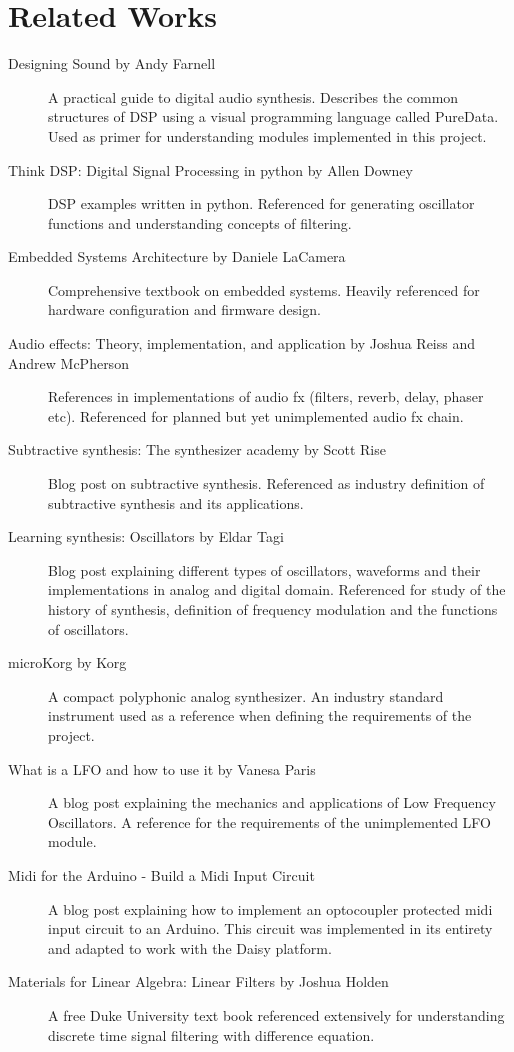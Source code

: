 \documentclass[acmlarge,screen]{acmart}
\begin{document}
\section{Related Works}
\begin{description}
	\item[Designing Sound by Andy Farnell] A practical guide to digital audio synthesis. Describes the common structures of DSP using a visual programming language called PureData. Used as primer for understanding modules implemented in this project.
	\item[Think DSP: Digital Signal Processing in python by Allen Downey] DSP examples written in python. Referenced for generating oscillator functions and understanding concepts of filtering.
	\item[Embedded Systems Architecture by Daniele LaCamera] Comprehensive textbook on embedded systems. Heavily referenced for hardware configuration and firmware design.
	\item[Audio effects: Theory, implementation, and application by Joshua Reiss and Andrew McPherson] References in implementations of audio fx (filters, reverb, delay, phaser etc). Referenced for planned but yet unimplemented audio fx chain.
	\item[Subtractive synthesis: The synthesizer academy by Scott Rise] Blog post on subtractive synthesis. Referenced as industry definition of subtractive synthesis and its applications.
	\item[Learning synthesis: Oscillators by Eldar Tagi] Blog post explaining different types of oscillators, waveforms and their implementations in analog and digital domain. Referenced for study of the history of synthesis, definition of frequency modulation and the functions of oscillators.
	\item[microKorg by Korg] A compact polyphonic analog synthesizer. An industry standard instrument used as a reference when defining the requirements of the project.
	\item[What is a LFO and how to use it by Vanesa Paris] A blog post explaining the mechanics and applications of Low Frequency Oscillators. A reference for the requirements of the unimplemented LFO module.
	\item[Midi for the Arduino - Build a Midi Input Circuit] A blog post explaining how to implement an optocoupler protected midi input circuit to an Arduino. This circuit was implemented in its entirety and adapted to work with the Daisy platform.
	\item[Materials for Linear Algebra: Linear Filters by Joshua Holden] A free Duke University text book referenced extensively for understanding discrete time signal filtering with difference equation.

\end{description}
\end{document}
